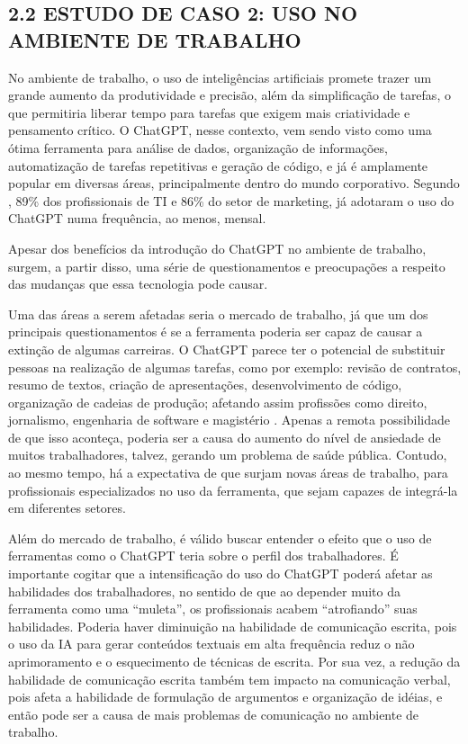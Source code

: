\subsection*{{2.2 ESTUDO DE CASO 2: USO NO AMBIENTE DE TRABALHO}}
No ambiente de trabalho, o uso de inteligências artificiais promete trazer um grande aumento da produtividade e precisão, além da simplificação de tarefas, o que permitiria liberar tempo para tarefas que exigem mais criatividade e pensamento crítico. O ChatGPT, nesse contexto, vem sendo visto como uma ótima ferramenta para análise de dados, organização de informações, automatização de tarefas repetitivas e geração de código, e já é amplamente popular em diversas áreas, principalmente dentro do mundo corporativo. Segundo \textcite{lopes2024}, 89\% dos profissionais de TI e 86\% do setor de marketing, já adotaram o uso do ChatGPT numa frequência, ao menos, mensal.

Apesar dos benefícios da introdução do ChatGPT no ambiente de trabalho, surgem, a partir disso, uma série de questionamentos e preocupações a respeito das mudanças que essa tecnologia pode causar. 

Uma das áreas a serem afetadas seria o mercado de trabalho, já que um dos principais questionamentos é se a ferramenta poderia ser capaz de causar a extinção de algumas carreiras. O ChatGPT parece ter o potencial de substituir pessoas na realização de algumas tarefas, como por exemplo: revisão de contratos, resumo de textos, criação de apresentações, desenvolvimento de código, organização de cadeias de produção; afetando assim profissões como direito, jornalismo, engenharia de software e magistério \cite{sutto2023}. Apenas a remota possibilidade de que isso aconteça, poderia ser a causa do aumento do nível de ansiedade de muitos trabalhadores, talvez, gerando um problema de saúde pública. Contudo, ao mesmo tempo, há a expectativa de que surjam novas áreas de trabalho,  para profissionais especializados no uso da ferramenta, que sejam capazes de integrá-la em diferentes setores.

Além do mercado de trabalho, é válido buscar entender o efeito que o uso de ferramentas como o ChatGPT teria sobre o perfil dos trabalhadores. É importante cogitar que a intensificação do uso do ChatGPT poderá afetar as habilidades dos trabalhadores, no sentido de que ao depender muito da ferramenta como uma “muleta”, os profissionais acabem “atrofiando” suas habilidades. Poderia haver diminuição na habilidade de comunicação escrita, pois o uso da IA para gerar conteúdos textuais em alta frequência reduz o não aprimoramento e o esquecimento de técnicas de escrita. Por sua vez, a redução da habilidade de comunicação escrita também tem impacto na comunicação verbal, pois afeta a habilidade de formulação de argumentos e organização de idéias, e então pode ser a causa de mais problemas de comunicação no ambiente de trabalho. 

